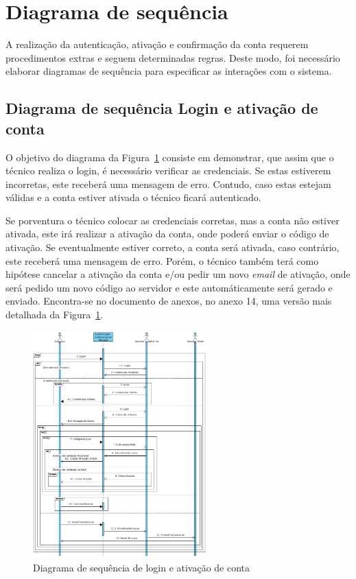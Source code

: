 \newpage

\section{Diagrama de sequência}

A realização da autenticação, ativação e confirmação da conta requerem procedimentos extras e seguem determinadas regras. Deste modo, foi necessário elaborar diagramas de sequência para especificar as interações com o sistema.

\subsection{Diagrama de sequência Login e ativação de conta}\label{sec:sequencia_login}

O objetivo do diagrama da Figura~\ref{fig:43} consiste em demonstrar, que assim que o técnico realiza o login, é necessário verificar as credenciais. Se estas estiverem incorretas, este receberá uma mensagem de erro. Contudo, caso estas estejam válidas e a conta estiver ativada o técnico ficará autenticado. 

Se porventura o técnico colocar as credenciais corretas, mas a conta não estiver ativada, este irá realizar a ativação da conta, onde poderá enviar o código de ativação. Se eventualmente estiver correto, a conta será ativada, caso contrário, este receberá uma mensagem de erro. Porém, o técnico também terá como hipótese cancelar a ativação da conta e/ou pedir um novo \textit{email} de ativação, onde será pedido um novo código ao servidor e este automáticamente será gerado e enviado. Encontra-se no documento de anexos, no anexo 14, uma versão mais detalhada da Figura~\ref*{fig:43}.


\begin{figure}[htb]
  \centering
  \includegraphics[width=0.6\textwidth]{images/diagramas/sequencia/diagrama_login.png}
  \caption{Diagrama de sequência de login e ativação de conta}
  \label{fig:43}
\end{figure}

